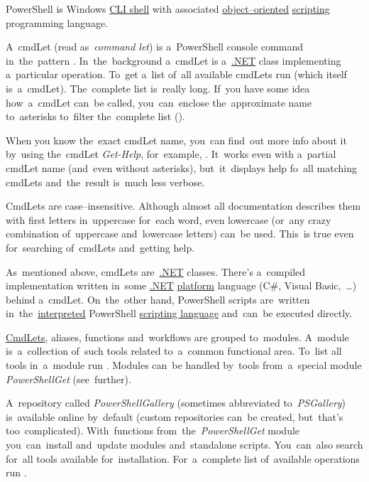 \label{powershell}
PowerShell is Windows \hyperref[shellcligui]{CLI shell} with associated \hyperref[objectorientedprogramming]{object--oriented} \hyperref[scriptinglanguages]{scripting} programming language.

\label{cmdlet}
A~cmdLet (read as~\textit{command let}) is a~PowerShell console command in~the~pattern .
In~the~background a~cmdLet is a~\hyperref[dotnet]{.NET} class implementing a~particular operation.
To~get a~list of~all available cmdLets run  (which itself is~a~cmdLet).
The~complete list is~really long.
If~you have some idea how~a~cmdLet can~be called, you~can~enclose the~approximate name to~asterisks to~filter the~complete list ().

When you know the~exact cmdLet name, you~can find~out more info about it by~using the~cmdLet \textit{Get-Help}, for~example, .
It~works even with a~partial cmdLet name (and~even without asterisks), but~it~displays help fo~all matching cmdLets and~the~result is~much less verbose.

CmdLets are case--insensitive.
Although almost all documentation describes them with first letters in~uppercase for~each word, even lowercase (or~any crazy combination of~uppercase and~lowercase letters) can~be used.
This~is true even for~searching of~cmdLets and~getting help.

As~mentioned above, cmdLets are~\hyperref[dotnet]{.NET} classes.
There's a~compiled implementation written in~some \hyperref[dotnet]{.NET} \hyperref[platform]{platform} language (C\#, Visual Basic,~\dots) behind a~cmdLet.
On~the~other hand, PowerShell scripts are~written in~the~\hyperref[compiledinterpretedlanguages]{interpreted} PowerShell \hyperref[scriptinglanguages]{scripting language} and~can~be executed directly.

\label{powershellmodule}
\hyperref[cmdlet]{CmdLets}, aliases, functions and~workflows are grouped to~modules.
A~module is~a~collection of~such tools related to~a~common functional area.
To~list all tools in~a~module run .
Modules can~be handled by~tools from~a~special module \textit{PowerShellGet} (see~further).

A~repository called \textit{PowerShellGallery} (sometimes abbreviated to~\textit{PSGallery}) is~available online by~default (custom repositories can~be created, but~that's too~complicated).
With~functions from~the~\textit{PowerShellGet} module you~can~install and~update modules and~standalone scripts.
You~can~also search for~all tools available for~installation.
For~a~complete list of~available operations run .

